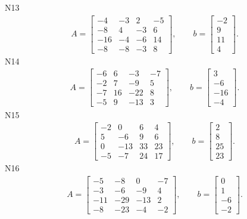 \documentclass[11pt]{report}
\begin{document}
N13
\begin{align*}
 A = \left[\begin{matrix}-4 & -3 & 2 & -5\\-8 & 4 & -3 & 6\\-16 & -4 & -6 & 14\\-8 & -8 & -3 & 8\end{matrix}\right],
\qquad b = \left[\begin{matrix}-2\\9\\11\\4\end{matrix}\right]. 
 \end{align*}
N14
\begin{align*}
 A = \left[\begin{matrix}-6 & 6 & -3 & -7\\-2 & 7 & -9 & 5\\-7 & 16 & -22 & 8\\-5 & 9 & -13 & 3\end{matrix}\right],
\qquad b = \left[\begin{matrix}3\\-6\\-16\\-4\end{matrix}\right]. 
 \end{align*}
N15
\begin{align*}
 A = \left[\begin{matrix}-2 & 0 & 6 & 4\\5 & -6 & 9 & 6\\0 & -13 & 33 & 23\\-5 & -7 & 24 & 17\end{matrix}\right],
\qquad b = \left[\begin{matrix}2\\8\\25\\23\end{matrix}\right]. 
 \end{align*}
N16
\begin{align*}
 A = \left[\begin{matrix}-5 & -8 & 0 & -7\\-3 & -6 & -9 & 4\\-11 & -29 & -13 & 2\\-8 & -23 & -4 & -2\end{matrix}\right],
\qquad b = \left[\begin{matrix}0\\1\\-6\\-2\end{matrix}\right]. 
 \end{align*}
\end{document}
